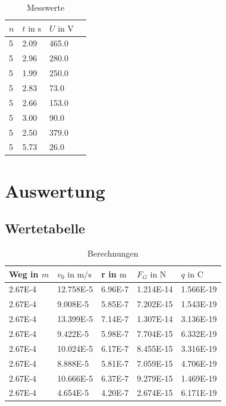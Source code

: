 \documentclass[a4paper,12pt,fleqn,oneside]{article}
\begin{document}
	\begin{table}[h!]
		\centering
		\begin{tabular}{@{}llll@{}}
			\toprule
			$n$		&	$t \text{ in }\si{\second}$	& $U \text{ in } \si{\volt}$	&	\\ \midrule
			\num{5}	&	\num{2.09}				& \num{465.0}			&	\\
			\num{5}	&	\num{2.96}				& \num{280.0}			&	\\
			\num{5}	&	\num{1.99}				& \num{250.0}			&	\\
			\num{5}	&	\num{2.83}				& \num{73.0}				&	\\
			\num{5}	&	\num{2.66}				& \num{153.0}			&	\\
			\num{5}	&	\num{3.00}				& \num{90.0}				&	\\
			\num{5}	&	\num{2.50}				& \num{379.0}			&	\\
			\num{5}	&	\num{5.73}				& \num{26.0}				&	\\ \bottomrule
		\end{tabular}
		\caption{Messwerte}
		\label{tab:messwerte}
	\end{table}


\newpage
\section{Auswertung}
	\subsection{Wertetabelle}

	\begin{table}[h!]
	\centering
	\begin{tabular}{@{}lllll@{}}
		\toprule
		Weg in $m$		& $v_{0} \text{ in }\si{\meter\per\second}$	& r in $\si{\metre}$	& $F_{G} \text{ in }\si{\newton}$	& $q \text{ in }\si{\coulomb}$	\\ \midrule
		\num{2.67E-4}	& \num{12.758E-5}						& \num{6.96E-7}		& \num{1.214E-14}				& \num{1.566E-19}			\\
		\num{2.67E-4}	& \num{9.008E-5}							& \num{5.85E-7}		& \num{7.202E-15}				& \num{1.543E-19}			\\
		\num{2.67E-4}	& \num{13.399E-5}						& \num{7.14E-7}		& \num{1.307E-14}				& \num{3.136E-19}			\\
		\num{2.67E-4}	& \num{9.422E-5}							& \num{5.98E-7}		& \num{7.704E-15}				& \num{6.332E-19}			\\
		\num{2.67E-4}	& \num{10.024E-5}						& \num{6.17E-7}		& \num{8.455E-15}				& \num{3.316E-19}			\\
		\num{2.67E-4}	& \num{8.888E-5}							& \num{5.81E-7}		& \num{7.059E-15}				& \num{4.706E-19}			\\
		\num{2.67E-4}	& \num{10.666E-5}						& \num{6.37E-7}		& \num{9.279E-15}				& \num{1.469E-19}			\\
		\num{2.67E-4}	& \num{4.654E-5}							& \num{4.20E-7}		& \num{2.674E-15}				& \num{6.171E-19}			\\ \bottomrule
		\end{tabular}
	\caption{Berechnungen}
	\label{tab:berechnungen}
	\end{table}
\end{document}
